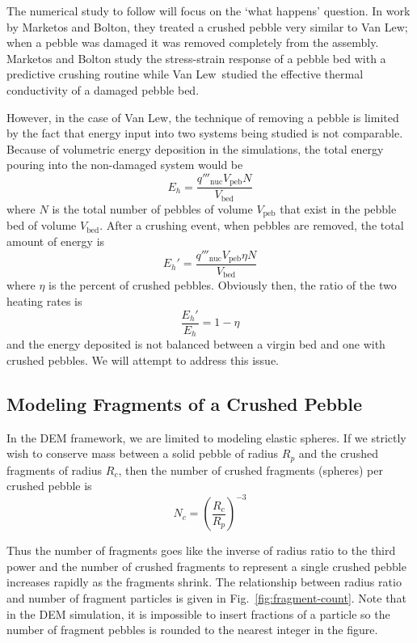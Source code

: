 The numerical study to follow will focus on the `what happens' question. In work by Marketos and Bolton, they treated a crushed pebble very similar to Van Lew\etal; when a pebble was damaged it was removed completely from the assembly.\cite{Marketos2007,VanLew2014} Marketos and Bolton study the stress-strain response of a pebble bed with a predictive crushing routine while Van Lew\etal~studied the effective thermal conductivity of a damaged pebble bed.

However, in the case of Van Lew\etal, the technique of removing a pebble is limited by the fact that energy input into two systems being studied is not comparable. Because of volumetric energy deposition in the simulations, the total energy pouring into the non-damaged system would be
\begin{equation}
	E_h = \frac{q'''_\text{nuc} V_\text{peb} N}{V_\text{bed}}
\end{equation}
where $N$ is the total number of pebbles of volume $V_\text{peb}$ that exist in the pebble bed of volume $V_\text{bed}$. After a crushing event, when pebbles are removed, the total amount of energy is
\begin{equation}
	E_h' = \frac{q'''_\text{nuc} V_\text{peb} \eta N}{V_\text{bed}}
\end{equation}
where $\eta$ is the percent of crushed pebbles. Obviously then, the ratio of the two heating rates is\begin{equation}
	\frac{E_h'}{E_h} = 1 - \eta
\end{equation}
and the energy deposited is not balanced between a virgin bed and one with crushed pebbles. We will attempt to address this issue.

\subsection{Modeling Fragments of a Crushed Pebble}\label{sec:fragmentation}
In the DEM framework, we are limited to modeling elastic spheres. If we strictly wish to conserve mass between a solid pebble of radius $R_p$ and the crushed fragments of radius $R_c$, then the number of crushed fragments (spheres) per crushed pebble is
\begin{equation}\label{eq:nc-crushed-fragments}
	N_c = \left(\frac{R_c}{R_p}\right)^{-3}
\end{equation}

Thus the number of fragments goes like the inverse of radius ratio to the third power and the number of crushed fragments to represent a single crushed pebble increases rapidly as the fragments shrink. The relationship between radius ratio and number of fragment particles is given in Fig.~\ref{fig:fragment-count}. Note that in the DEM simulation, it is impossible to insert fractions of a particle so the number of fragment pebbles is rounded to the nearest integer in the figure.



